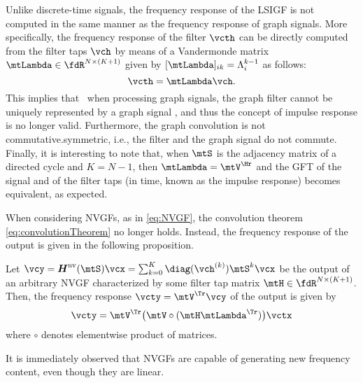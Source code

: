 Unlike discrete-time signals, the frequency response of the LSIGF is not computed in the same manner as the frequency response of graph signals. More specifically, the frequency response of the filter $\vcth$ can be directly computed from the filter taps $\vch$ by means of a Vandermonde matrix $\mtLambda \in \fdR^{N \times (K+1)}$ given by $[\mtLambda]_{ik} = \lambda_{i}^{k-1}$ as follows:
\begin{equation} \label{eq:GFTfilter}
    \vcth = \mtLambda \vch.
\end{equation}
%
This implies that \else\ when processing graph signals, the graph filter cannot be uniquely represented by a graph signal \cite[Th. 5]{Sandryhaila2013-DSPG}, and thus the concept of impulse response is no longer valid. Furthermore, \fi
the graph convolution is not commutative.\else symmetric, i.e., the filter and the graph signal do not commute. Finally, it is interesting to note that, when $\mtS$ is the adjacency matrix of a directed cycle and $K=N-1$, then $\mtLambda = \mtV^{\Hr}$ and the GFT of the signal and of the filter taps (in time, known as the impulse response) becomes equivalent, as expected.\fi

When considering NVGFs, as in \eqref{eq:NVGF}, the convolution theorem \eqref{eq:convolutionTheorem} no longer holds. Instead, the frequency response of the output is given in the following proposition.

\begin{proposition} \label{prop:GFToutputNVGF}
Let $\vcy = \mtfnH^{\text{nv}}(\mtS) \vcx = \sum_{k=0}^{K} \diag(\vch^{(k)}) \mtS^{k} \vcx$ be the output of an arbitrary NVGF characterized by some filter tap matrix $\mtH \in \fdR^{N \times(K+1)}$. Then, the frequency response $\vcty = \mtV^{\Tr}\vcy$ of the output is given by
\begin{equation} \label{eq:GFToutputNVGF}
    \vcty = \mtV^{\Tr} \big( \mtV \circ (\mtH \mtLambda^{\Tr}) \big) \vctx
\end{equation}
%
where $\circ$ denotes elementwise product of matrices.
\end{proposition}

It is immediately observed that NVGFs are capable of generating new frequency content, even though they are linear.

